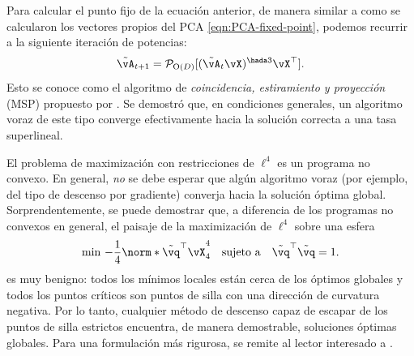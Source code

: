 \documentclass[../../book-main.tex]{subfiles}
\begin{document}
Para calcular el punto fijo de la ecuación anterior, de manera similar a como se calcularon
los vectores propios del PCA \eqref{eqn:PCA-fixed-point}, podemos recurrir a la siguiente
iteración de potencias:
\begin{equation}\label{eq:msp_iteration}
    \tilde{\vA}_{t+1} = \mathcal{P}_{\mathrm O(D)}[( {\tilde{\vA}_t
    \vX})^{\hada 3}\vX^\top].
\end{equation}
Esto se conoce como el algoritmo de {\em coincidencia, estiramiento y proyección} (MSP)
propuesto por \cite{Zhai-2020}. Se demostró que, en condiciones generales,
un algoritmo voraz de este tipo converge efectivamente hacia la solución correcta
a una tasa superlineal.

\begin{remark}\label{rem:L4-global}
    El problema de maximización con restricciones de $\ell^4$ es un programa
    no convexo. En general, \textit{no} se debe esperar que algún
    algoritmo voraz (por ejemplo, del tipo de descenso por gradiente) converja hacia
    la solución óptima global. Sorprendentemente, se puede demostrar que,
    a diferencia de los programas no convexos en general, el paisaje de la maximización de $\ell^4$
    sobre una esfera
    \begin{equation}\label{eq:l4-maximization-sphere}
        \min\,
        -   \frac{1}{4} \norm*{
            \tilde{\vq}^\top \vX
        }_4^4 \quad \mbox{sujeto a} \quad  \tilde{\vq}^\top\tilde{\vq} = 1.
    \end{equation}
    es muy benigno: todos los mínimos locales están cerca de los óptimos globales
    y todos los puntos críticos son puntos de silla con una dirección de
    curvatura negativa. Por lo tanto, cualquier método de descenso capaz de
    escapar de los puntos de silla estrictos encuentra, de manera demostrable,
    soluciones óptimas globales. Para una formulación más rigurosa, se remite al 
    lector interesado a \cite{Qu2020Geometric}.
\end{remark}
\end{document}
